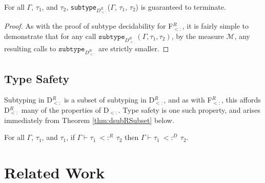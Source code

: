\documentclass[runningheads, anon]{llncs}
\begin{document}
\begin{theorem}
\label{thm:FRdecidability}
For all $\Gamma$, $\tau_1$, and $\tau_2$, \texttt{subtype}$_{D_{<:}^R}$($\Gamma$, $\tau_1$, $\tau_2$) is guaranteed to terminate.
\end{theorem}
\begin{proof}
As with the proof of subtype decidability for F$_{<:}^R$, it is fairly simple to  demonstrate 
that for any call $\texttt{subtype}_{D_{<:}^R}(\Gamma, \tau_1, \tau_2)$, by the measure $\mathcal{M}$,
any resulting calls to $\texttt{subtype}_{D_{<:}^R}$ are strictly smaller.
\end{proof}

\subsection{Type Safety}
Subtyping in D$_{<:}^R$ is a subset of subtyping in D$_{<:}^R$, and as with F$_{<:}^R$, this affords D$_{<:}^R$ 
many of the properties of D$_{<:}$. Type safety is one such property, and arises immediately from Theorem 
\ref{thm:dsubRSubset} below.

\begin{theorem}[D$_{<:}^R$ $\subset$ D$_{<:}$]
\label{thm:dsubRSubset}
For all $\Gamma$, $\tau_1$, and $\tau_1$, if $\Gamma \vdash \tau_1\ <:^R\ \tau_2$ then 
$\Gamma \vdash \tau_1\ <:^D\ \tau_2$.
\end{theorem}


\section{Related Work}
\end{document}
